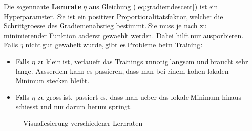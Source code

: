 \documentclass[../main]{subfiles}
\begin{document}
Die sogennante \textbf{Lernrate} $\eta$ aus Gleichung (\ref{eq:gradientdescent}) ist ein Hyperparameter.
Sie ist ein positiver Proportionalitatsfaktor, welcher die Schrittgroesse des Gradientenabstieg bestimmt. Sie muss je nach zu minimierender Funktion anderst gewaehlt werden.
Dabei hilft nur ausporbieren. Falls $\eta$ nicht gut gewahelt wurde, gibt es Probleme beim Training:
\begin{itemize}
    \item{Falls $\eta$ zu klein ist, verlaueft das Trainings unnotig langsam und braucht sehr lange.
        Ausserdem kann es passieren, dass man bei einem hohen lokalen Minimum stecken bleibt.}

    \item{Falls $\eta$ zu gross ist, passiert es, dass man ueber das lokale Minimum hinaus schiesst und nur darum herum springt.}

\end{itemize}
\begin{figure}[h!]
    \caption{Visualiesierung verschiedener Lernraten}
\end{figure}

\par\medskip
\end{document}
